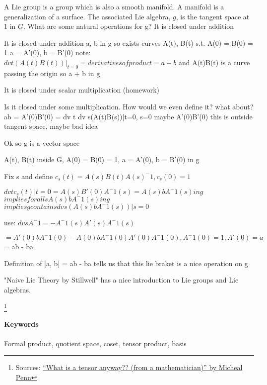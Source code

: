 \begin{multicols}{3}
  A Lie group is a group which is also a smooth manifold. A manifold is a generalization of a surface.
  The associated Lie algebra, $g$, is the tangent space at 1 in $G$.
  What are some natural operations for g?
  It is closed under addition
\end{multicols}



It is closed under addition
a, b in g
so
exists curves A(t), B(t) s.t.
A(0) = B(0) = 1
a = A'(0), b = B'(0)
note:
$dv t (A(t)B(t))|_{t=0} = derivatives of product = a + b$
and A(t)B(t) is a curve passing the origin so
a + b in g

It is closed under scalar multiplication (homework)

Is it closed under some multiplication. How would we even define it?
what about?
ab = A'(0)B'(0) = dv t dv s(A(t)B(s))|t=0, s=0
maybe A'(0)B'(0) this is outside tangent space, maybe bad idea

Ok so g is a vector space

A(t), B(t) inside G, A(0) = B(0) = 1, a = A'(0), b = B'(0) in g

Fix s and define
$c_s(t) = A(s)B(t)A(s)^-1, c_s(0) = 1$

$dv t c_s(t)|t=0 = A(s)B'(0)A^-1(s) = A(s)bA^-1(s) in g$
$implies forall s A(s)bA^-1(s) in g$
$implies g contains dv s (A(s)bA^-1(s))|s=0$

use:
$dv s A^-1 = -A^-1(s)A'(s)A^-1(s)$

$= A'(0)bA^-1(0) - A(0)bA^-1(0)A'(0)A^-1(0), A^-1(0) = 1, A'(0) = a$
= ab - ba

Definition of [a, b] = ab - ba tells us that this lie braket is a nice
operation on g


"Naive Lie Theory by Stillwell" has a nice introduction to Lie groups
and Lie algebras.





\footnote{Sources: \href{https://youtu.be/K7f2pCQ3p3U?si=9kCDjIPKh2ep6fXa}{``What is a tensor anyway?? (from a mathematician)'' by Micheal Penn}}


\paragraph{\textbf{Keywords}}
Formal product, quotient space, coset, tensor product, basis

\begin{multicols}{3}
\end{multicols}



